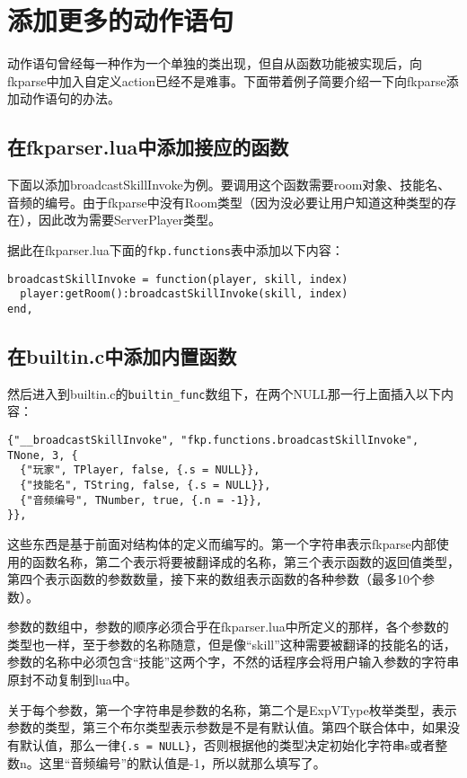 \chapter{添加更多的动作语句}

动作语句曾经每一种作为一个单独的类出现，但自从函数功能被实现后，向fkparse中加入自定义action已经不是难事。下面带着例子简要介绍一下向fkparse添加动作语句的办法。

\section{在fkparser.lua中添加接应的函数}

下面以添加broadcastSkillInvoke为例。要调用这个函数需要room对象、技能名、音频的编号。由于fkparse中没有Room类型（因为没必要让用户知道这种类型的存在），因此改为需要ServerPlayer类型。

据此在fkparser.lua下面的\verb|fkp.functions|表中添加以下内容：

\begin{verbatim}
broadcastSkillInvoke = function(player, skill, index)
  player:getRoom():broadcastSkillInvoke(skill, index)
end,
\end{verbatim}

\section{在builtin.c中添加内置函数}

然后进入到builtin.c的\verb|builtin_func|数组下，在两个NULL那一行上面插入以下内容：

\begin{verbatim}
{"__broadcastSkillInvoke", "fkp.functions.broadcastSkillInvoke", TNone, 3, {
  {"玩家", TPlayer, false, {.s = NULL}},
  {"技能名", TString, false, {.s = NULL}},
  {"音频编号", TNumber, true, {.n = -1}},
}},
\end{verbatim}

这些东西是基于前面对结构体的定义而编写的。第一个字符串表示fkparse内部使用的函数名称，第二个表示将要被翻译成的名称，第三个表示函数的返回值类型，第四个表示函数的参数数量，接下来的数组表示函数的各种参数（最多10个参数）。

参数的数组中，参数的顺序必须合乎在fkparser.lua中所定义的那样，各个参数的类型也一样，至于参数的名称随意，但是像“skill”这种需要被翻译的技能名的话，参数的名称中必须包含“技能”这两个字，不然的话程序会将用户输入参数的字符串原封不动复制到lua中。

关于每个参数，第一个字符串是参数的名称，第二个是ExpVType枚举类型，表示参数的类型，第三个布尔类型表示参数是不是有默认值。第四个联合体中，如果没有默认值，那么一律\verb|{.s = NULL}|，否则根据他的类型决定初始化字符串s或者整数n。这里“音频编号”的默认值是-1，所以就那么填写了。


